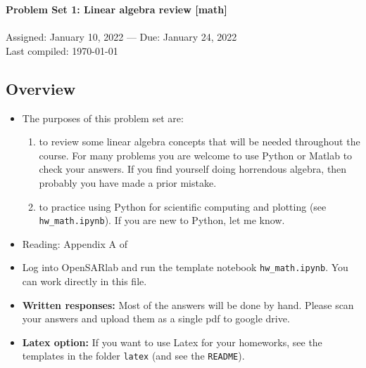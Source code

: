 \documentclass[11pt,titlepage,fleqn]{article}
\begin{document}

\begin{spacing}{1.2}
\centering
{\large \bf Problem Set 1: Linear algebra review [math]} \\
\cltag\ \\
Assigned: January 10, 2022 --- Due: January 24, 2022 \\
Last compiled: \today
\end{spacing}


\subsection*{Overview}

\begin{itemize}

\item The purposes of this problem set are:
%
\begin{enumerate}
\item  to review some linear algebra concepts that will be needed throughout the course.
For many problems you are welcome to use Python or Matlab to check your answers. If you find yourself doing horrendous algebra, then probably you have made a prior mistake.
\item to practice using Python for scientific computing and plotting (see \verb+hw_math.ipynb+).
If you are new to Python, let me know.
\end{enumerate}

\item Reading: Appendix A of \citet{Aster}

\item Log into OpenSARlab and run the template notebook \verb+hw_math.ipynb+. You can work directly in this file.

\item {\bf Written responses:}
Most of the answers will be done by hand. Please scan your answers and upload them as a single pdf to google drive.

\item {\bf Latex option:}
If you want to use Latex for your homeworks, see the templates in the folder \verb+latex+ (and see the \verb+README+).

\end{itemize}
\end{document}
